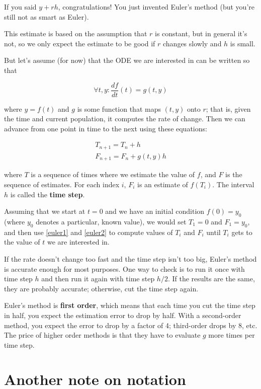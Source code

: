 If you said $y + r h$, congratulations! You just invented
Euler's method (but you're still not as smart as Euler).

This estimate is based on the assumption that $r$ is constant, but
in general it's not, so we only expect the estimate to be good if
$r$ changes slowly and $h$ is small.

But let's assume (for now) that the ODE we are interested in can
be written so that

\[ \forall t,y: \frac{df}{dt}(t) = g(t, y) \]

where $y=f(t)$ and $g$ is some function that maps $(t, y)$ onto $r$;
that is, given the time and current population, it computes the rate
of change. Then we can advance from one point in time to the
next using these equations:

\begin{eqnarray}
\label{euler1}
T_{n+1} = T_n + h       \\
\label{euler2}
F_{n+1} = F_n + g(t,y) h
\end{eqnarray}

where $T$ is a sequence of times where we estimate the value
of $f$, and $F$ is the sequence of estimates. For each
index $i$, $F_i$ is an estimate of $f(T_i)$.
The interval $h$ is called the {\bf time step}.

Assuming that we start at $t=0$ and we have an initial condition $f(0)
= y_0$ (where $y_0$ denotes a particular, known value), we would set
$T_1 = 0$ and $F_1 = y_0$, and then use \autoref{euler1} and \autoref{euler2}
to
compute values of $T_i$ and $F_i$ until $T_i$ 
gets to the value of $t$ we are interested in.

If the rate doesn't change too fast and the time step isn't
too big, Euler's method is accurate enough for most purposes. One
way to check is to run it once with time step $h$ and then run it
again with time step $h/2$. If the results are the same, they are
probably accurate; otherwise, cut the time step again.

Euler's method is {\bf first order}, which means that each time you
cut the time step in half, you expect the estimation error to drop by
half. With a second-order method, you expect the error to drop by a
factor of 4; third-order drops by 8, etc. The price of higher order
methods is that they have to evaluate $g$ more times per time step.


\section{Another note on notation}

